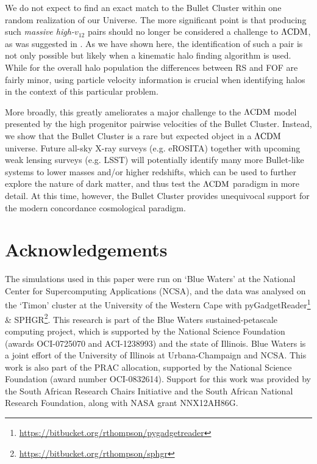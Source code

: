 \documentclass[useAMS, usenatbib]{mn2e}
\newcommand{\vonetwo}{v_{12}}
\newcommand{\lcdm}{\Lambda\rm{CDM}}
\begin{document}
We do not expect to find an exact match to the Bullet Cluster within
one random realization of our Universe.  The more significant point
is that producing such {\it massive high-$\vonetwo$} pairs should no
longer be considered a challenge to $\lcdm$, as was suggested in
\citet{Lee10,Thompson12}.  
As we have shown here, the identification
of such a pair is not only possible but likely when a kinematic
halo finding algorithm is used.  While for the overall halo population
the differences between RS and FOF are fairly minor, using particle
velocity information is crucial when identifying halos in the context
of this particular problem.

More broadly, this greatly ameliorates a major challenge to the
$\lcdm$ model presented by the high progenitor pairwise velocities
of the Bullet Cluster.  Instead, we show that the Bullet Cluster
is a rare but expected object in a $\lcdm$ universe.  Future all-sky
X-ray surveys 
(e.g. eROSITA)
together with upcoming weak lensing surveys 
(e.g. LSST)
will potentially identify many more
Bullet-like systems to lower masses and/or higher redshifts, which
can be used to further explore the nature of dark matter, and
thus test the $\lcdm$ paradigm in more detail.  At this time,
however, the Bullet Cluster provides unequivocal support for the
modern concordance cosmological paradigm.


 \section*{Acknowledgements}
The simulations used in this paper were run on `Blue Waters' at the
National Center for Supercomputing Applications (NCSA), and the data was
analysed on the `Timon' cluster at the University of the Western Cape with 
{\small pyGadgetReader}\footnote{\url{https://bitbucket.org/rthompson/pygadgetreader}} \& 
{\small SPHGR}\footnote{\url{https://bitbucket.org/rthompson/sphgr}}.
This research is part of the Blue Waters sustained-petascale
computing project, which is supported by the National Science
Foundation (awards OCI-0725070 and ACI-1238993) and the state of
Illinois.  Blue Waters is a joint effort of the University of
Illinois at Urbana-Champaign and NCSA.  This work is also part of
the PRAC allocation, supported by the National Science Foundation
(award number OCI-0832614).  Support for this work was provided by
the South African Research Chairs Initiative and the South African
National Research Foundation, along with NASA grant NNX12AH86G.
\end{document}
